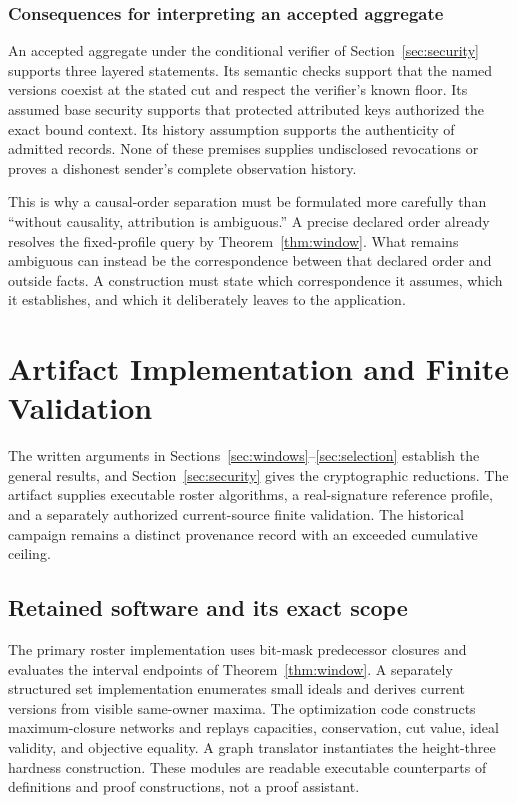 \documentclass[11pt]{article}
\theoremstyle{definition}
\begin{document}
\subsubsection{Consequences for interpreting an accepted aggregate}
An accepted aggregate under the conditional verifier of Section~\ref{sec:security} supports three layered statements. Its semantic checks support that the named versions coexist at the stated cut and respect the verifier's known floor. Its assumed base security supports that protected attributed keys authorized the exact bound context. Its history assumption supports the authenticity of admitted records. None of these premises supplies undisclosed revocations or proves a dishonest sender's complete observation history.

This is why a causal-order separation must be formulated more carefully than ``without causality, attribution is ambiguous.'' A precise declared order already resolves the fixed-profile query by Theorem~\ref{thm:window}. What remains ambiguous can instead be the correspondence between that declared order and outside facts. A construction must state which correspondence it assumes, which it establishes, and which it deliberately leaves to the application.

\section{Artifact Implementation and Finite Validation}\label{sec:evidence}
The written arguments in Sections~\ref{sec:windows}--\ref{sec:selection} establish the general results, and Section~\ref{sec:security} gives the cryptographic reductions. The artifact supplies executable roster algorithms, a real-signature reference profile, and a separately authorized current-source finite validation. The historical campaign remains a distinct provenance record with an exceeded cumulative ceiling.

\subsection{Retained software and its exact scope}
The primary roster implementation uses bit-mask predecessor closures and evaluates the interval endpoints of Theorem~\ref{thm:window}.  A separately structured set implementation enumerates small ideals and derives current versions from visible same-owner maxima.  The optimization code constructs maximum-closure networks and replays capacities, conservation, cut value, ideal validity, and objective equality.  A graph translator instantiates the height-three hardness construction.  These modules are readable executable counterparts of definitions and proof constructions, not a proof assistant.
\end{document}
